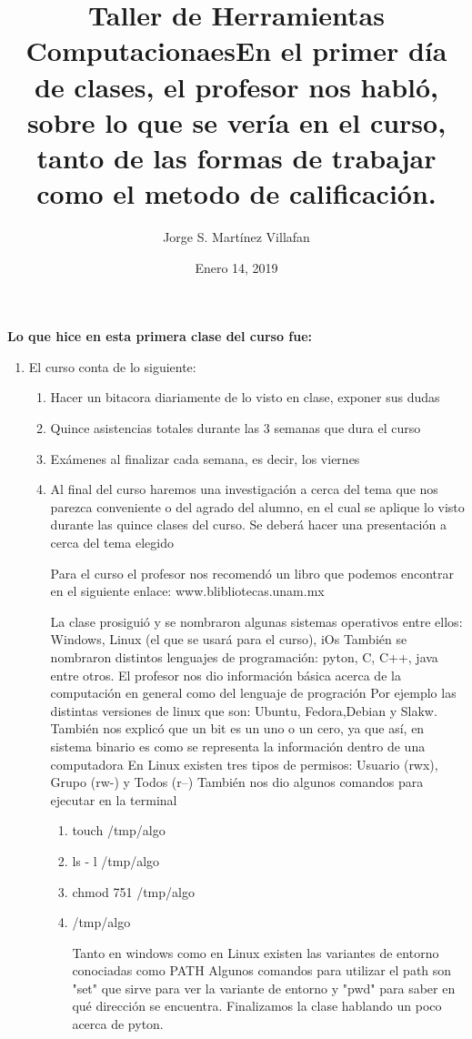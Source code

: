 \documentclass[letterpaper, 12pt, oneside]{article}%
\title{\Huge Taller de Herramientas Computacionaes}
\author{Jorge S. Martínez Villafan}
\date{Enero 14, 2019}
\begin{document}
\maketitle
\newpage
\title{En el primer día de clases, el profesor nos habló, sobre lo que se vería en el curso, tanto de las formas de trabajar como el metodo de calificación.}

\textbf{Lo que hice en esta primera clase del curso fue:}
\begin{enumerate}
	\item  El curso conta de lo siguiente:
	\begin{enumerate}
		\item Hacer un bitacora diariamente de lo visto en clase, exponer sus dudas
		\item Quince asistencias totales durante las 3 semanas que dura el curso
		\item Exámenes al finalizar cada semana, es decir, los viernes
		\item Al final del curso haremos una investigación a cerca del tema que nos parezca conveniente o del agrado del alumno, en el cual se aplique lo visto durante las quince clases del curso. Se deberá hacer una presentación a cerca del tema elegido
		
Para el curso el profesor nos recomendó un libro que podemos encontrar en el siguiente enlace: www.blibliotecas.unam.mx 

La clase prosiguió y se nombraron algunas sistemas operativos entre ellos: Windows, Linux (el que se usará para el curso), iOs
También se nombraron distintos lenguajes de programación: pyton, C, C++, java entre otros.
El profesor nos dio información básica acerca de la computación en general como del lenguaje de progración
Por ejemplo las distintas versiones de linux que son: Ubuntu, Fedora,Debian y Slakw.
También nos explicó que un bit es un uno o un cero, ya que así, en sistema binario es como se representa la información dentro de una computadora
 En Linux existen tres tipos de permisos: Usuario (rwx), Grupo (rw-) y Todos (r--)
 También nos dio algunos comandos para ejecutar en la terminal
 \begin{enumerate}
 	\item touch /tmp/algo
 	\item ls - l /tmp/algo
 	\item chmod 751 /tmp/algo
 	\item /tmp/algo
 	
Tanto en windows como en Linux existen las variantes de entorno conociadas como PATH
Algunos comandos para utilizar el path son "set" que sirve para ver la variante de entorno y "pwd" para saber en qué dirección se encuentra. 
Finalizamos la clase hablando un poco acerca de pyton.
 \end{enumerate}
		\end{enumerate}
\end{enumerate}	
			
\end{document}
